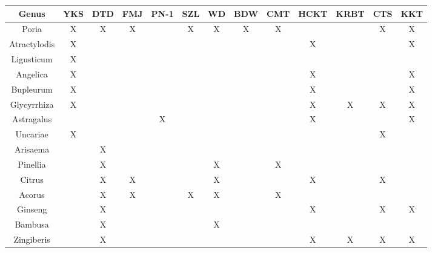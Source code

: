 \begin{table*}[htp]
\centering

\begin{tabular}{||c c c c c c c c c c c c c||}
 \hline
 Genus          & YKS & DTD & FMJ & PN-1 & SZL & WD & BDW & CMT & HCKT & KRBT & CTS & KKT  \\
 \hline\hline
 Poria          &  X  &  X  &  X  &      &  X  & X  &  X  &  X  &      &      &  X  &  X   \\
 Atractylodis   &  X  &     &     &      &     &    &     &     &  X   &      &     &  X   \\
 Ligusticum     &  X  &     &     &      &     &    &     &     &      &      &     &     \\
 Angelica       &  X  &     &     &      &     &    &     &     &  X   &      &     &  X   \\
 Bupleurum      &  X  &     &     &      &     &    &     &     &  X   &      &     &  X   \\
 Glycyrrhiza    &  X  &     &     &      &     &    &     &     &  X   &  X   &  X  &  X   \\
 Astragalus     &     &     &     &  X   &     &    &     &     &  X   &      &     &  X   \\
 Uncariae       &  X  &     &     &      &     &    &     &     &      &      &  X  &     \\
 Arisaema       &     &  X  &     &      &     &    &     &     &      &      &     &     \\
 Pinellia       &     &  X  &     &      &     & X  &     &  X  &      &      &     &     \\
 Citrus         &     &  X  &  X  &      &     & X  &     &     &  X   &      &  X  &     \\
 Acorus         &     &  X  &  X  &      &  X  & X  &     &  X  &      &      &     &     \\
 Ginseng        &     &  X  &     &      &     &    &     &     &  X   &      &  X  &  X   \\
 Bambusa        &     &  X  &     &      &     & X  &     &     &      &      &     &     \\
 Zingiberis     &     &  X  &     &      &     &    &     &     &  X   &  X   &  X  &  X   \\

\end{tabular}
\end{table*}

